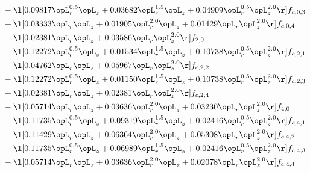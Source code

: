 \begin{alignat}{2}
& - \l[  0.09817 \opL_r^{0.5} \opL_z +  0.03682 \opL_r^{1.5} \opL_z +  0.04909 \opL_r^{0.5} \opL_z^{2.0}  \r] f_{c,0,3} \nonumber \\ 
& + \l[  0.03333 \opL_r \opL_z +  0.01905 \opL_r^{2.0} \opL_z +  0.01429 \opL_r \opL_z^{2.0}  \r] f_{c,0,4} \nonumber \\ 
& + \l[  0.02381 \opL_r \opL_z +  0.03586 \opL_r \opL_z^{2.0}  \r] f_{2,0} \nonumber \\ 
& - \l[  0.12272 \opL_r^{0.5} \opL_z +  0.01534 \opL_r^{1.5} \opL_z +  0.10738 \opL_r^{0.5} \opL_z^{2.0}  \r] f_{c,2,1} \nonumber \\ 
& + \l[  0.04762 \opL_r \opL_z +  0.05967 \opL_r \opL_z^{2.0}  \r] f_{c,2,2} \nonumber \\ 
& - \l[  0.12272 \opL_r^{0.5} \opL_z +  0.01150 \opL_r^{1.5} \opL_z +  0.10738 \opL_r^{0.5} \opL_z^{2.0}  \r] f_{c,2,3} \nonumber \\ 
& + \l[  0.02381 \opL_r \opL_z +  0.02381 \opL_r \opL_z^{2.0}  \r] f_{c,2,4} \nonumber \\ 
& - \l[  0.05714 \opL_r \opL_z +  0.03636 \opL_r^{2.0} \opL_z +  0.03230 \opL_r \opL_z^{2.0}  \r] f_{4,0} \nonumber \\ 
& + \l[  0.11735 \opL_r^{0.5} \opL_z +  0.09319 \opL_r^{1.5} \opL_z +  0.02416 \opL_r^{0.5} \opL_z^{2.0}  \r] f_{c,4,1} \nonumber \\ 
& - \l[  0.11429 \opL_r \opL_z +  0.06364 \opL_r^{2.0} \opL_z +  0.05308 \opL_r \opL_z^{2.0}  \r] f_{c,4,2} \nonumber \\ 
& + \l[  0.11735 \opL_r^{0.5} \opL_z +  0.06989 \opL_r^{1.5} \opL_z +  0.02416 \opL_r^{0.5} \opL_z^{2.0}  \r] f_{c,4,3} \nonumber \\ 
& - \l[  0.05714 \opL_r \opL_z +  0.03636 \opL_r^{2.0} \opL_z +  0.02078 \opL_r \opL_z^{2.0}  \r] f_{c,4,4} \nonumber \\ 
\end{alignat} 


